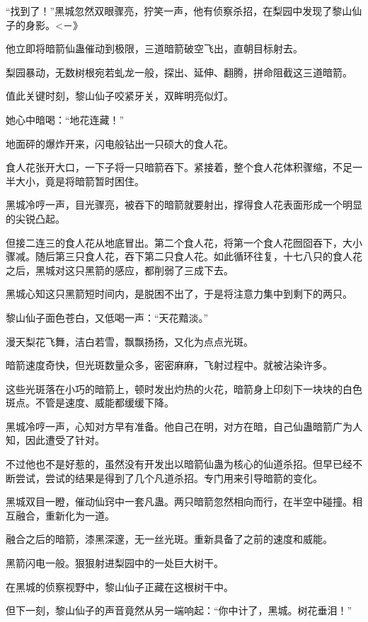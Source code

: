 
\begin{this_body}

“找到了！”黑城忽然双眼骤亮，狞笑一声，他有侦察杀招，在梨园中发现了黎山仙子的身影。<－》

他立即将暗箭仙蛊催动到极限，三道暗箭破空飞出，直朝目标射去。

梨园暴动，无数树根宛若虬龙一般，探出、延伸、翻腾，拼命阻截这三道暗箭。

值此关键时刻，黎山仙子咬紧牙关，双眸明亮似灯。

她心中暗喝：“地花连藏！”

地面砰的爆炸开来，闪电般钻出一只硕大的食人花。

食人花张开大口，一下子将一只暗箭吞下。紧接着，整个食人花体积骤缩，不足一半大小，竟是将暗箭暂时困住。

黑城冷哼一声，目光骤亮，被吞下的暗箭就要射出，撑得食人花表面形成一个明显的尖锐凸起。

但接二连三的食人花从地底冒出。第二个食人花，将第一个食人花囫囵吞下，大小骤减。随后第三只食人花，吞下第二只食人花。如此循环往复，十七八只的食人花之后，黑城对这只黑箭的感应，都削弱了三成下去。

黑城心知这只黑箭短时间内，是脱困不出了，于是将注意力集中到剩下的两只。

黎山仙子面色苍白，又低喝一声：“天花黯淡。”

漫天梨花飞舞，洁白若雪，飘飘扬扬，又化为点点光斑。

暗箭速度奇快，但光斑数量众多，密密麻麻，飞射过程中。就被沾染许多。

这些光斑落在小巧的暗箭上，顿时发出灼热的火花，暗箭身上印刻下一块块的白色斑点。不管是速度、威能都缓缓下降。

黑城冷哼一声，心知对方早有准备。他自己在明，对方在暗，自己仙蛊暗箭广为人知，因此遭受了针对。

不过他也不是好惹的，虽然没有开发出以暗箭仙蛊为核心的仙道杀招。但早已经不断尝试，尝试的结果是得到了几个凡道杀招。专门用来引导暗箭的变化。

黑城双目一瞪，催动仙窍中一套凡蛊。两只暗箭忽然相向而行，在半空中碰撞。相互融合，重新化为一道。

融合之后的暗箭，漆黑深邃，无一丝光斑。重新具备了之前的速度和威能。

黑箭闪电一般。狠狠射进梨园中的一处巨大树干。

在黑城的侦察视野中，黎山仙子正藏在这根树干中。

但下一刻，黎山仙子的声音竟然从另一端响起：“你中计了，黑城。树花垂泪！”


\end{this_body}
